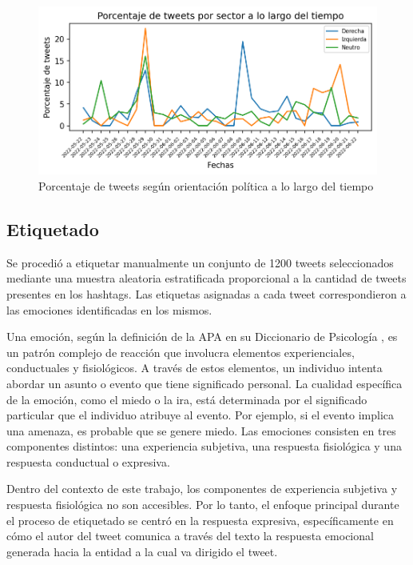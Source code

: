 \begin{figure}[!htbp]
	\centering
	\includegraphics{Images & Logos/EDA/Porcentaje de tweets por sector a lo largo del tiempo.png} 
	\caption{Porcentaje de tweets según orientación política a lo largo del tiempo}
	\label{figure:tweets_porcentaje_tiempo}
\end{figure}



\subsection{Etiquetado}


Se procedió a etiquetar manualmente un conjunto de 1200 tweets seleccionados mediante una muestra aleatoria estratificada proporcional a la cantidad de tweets presentes en los hashtags. Las etiquetas asignadas a cada tweet correspondieron a las emociones identificadas en los mismos.

Una emoción, según la definición de la APA en su Diccionario de Psicología  \citep{vandenbos2007apa}, es un patrón complejo de reacción que involucra elementos experienciales, conductuales y fisiológicos. A través de estos elementos, un individuo intenta abordar un asunto o evento que tiene significado personal. La cualidad específica de la emoción, como el miedo o la ira, está determinada por el significado particular que el individuo atribuye al evento. Por ejemplo, si el evento implica una amenaza, es probable que se genere miedo. Las emociones consisten en tres componentes distintos: una experiencia subjetiva, una respuesta fisiológica y una respuesta conductual o expresiva.

Dentro del contexto de este trabajo, los componentes de experiencia subjetiva y respuesta fisiológica no son accesibles. Por lo tanto, el enfoque principal durante el proceso de etiquetado se centró en la respuesta expresiva, específicamente en cómo el autor del tweet comunica a través del texto la respuesta emocional generada hacia la entidad a la cual va dirigido el tweet.

